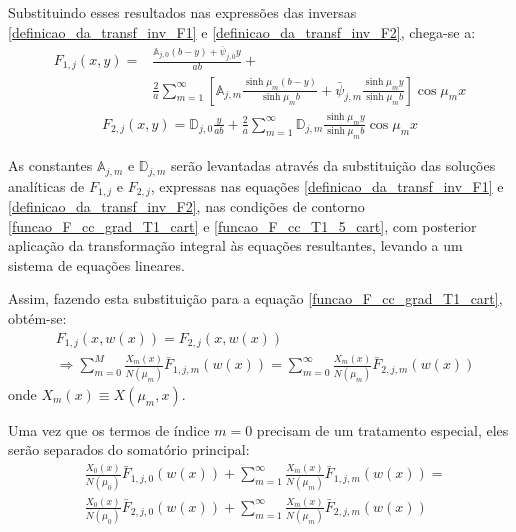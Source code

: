 Substituindo esses resultados
nas expressões das inversas \eqref{definicao_da_transf_inv_F1} e \eqref{definicao_da_transf_inv_F2}, chega-se a:
\begin{align}
F_{1, j}(x, y) = & \frac{\mathbb{A}_{j,0}(b - y) + \bar{\psi}_{j,0}y}{ab} + \nonumber \\
&\frac{2}{a}\sum_{m=1}^\infty\left[\mathbb{A}_{j,m}\frac{\sinh\mu_m (b - y)}{\sinh\mu_m b} + \bar{\psi}_{j, m}\frac{\sinh\mu_m y}{\sinh\mu_m b}\right]\cos\mu_m x
\label{solucao_transf_inversa_F1_com_dependencia}
\end{align}
\begin{align}
F_{2, j}(x, y) = \mathbb{D}_{j,0}\frac{y}{ab}  + \frac{2}{a}\sum_{m=1}^\infty\mathbb{D}_{j,m}\frac{\sinh\mu_m y}{\sinh\mu_m b} \cos\mu_m x
\label{solucao_transf_inversa_F2_com_dependencia}
\end{align}

As constantes $\mathbb{A}_{j,m}$ e $\mathbb{D}_{j,m}$ serão levantadas através da substituição das soluções analíticas de $F_{1,j}$ e $F_{2,j}$, expressas nas equações \eqref{definicao_da_transf_inv_F1} e
\eqref{definicao_da_transf_inv_F2}, nas condições de contorno \eqref{funcao_F_cc_grad_T1_cart} e \eqref{funcao_F_cc_T1_5_cart}, com posterior aplicação da transformação integral às equações resultantes, levando a um sistema de equações lineares.

Assim, fazendo esta
substituição para a equação \eqref{funcao_F_cc_grad_T1_cart}, obtém-se:
\begin{align}
& F_{1,j}(x, w(x)) = F_{2, j}(x, w(x)) \nonumber \\
& \Rightarrow \sum_{m=0}^M \frac{X_m(x)}{N(\mu_m)}\bar{F}_{1,j,m}(w(x)) = \sum_{m=0}^\infty \frac{X_m(x)}{N(\mu_m)}\bar{F}_{2,j,m}(w(x))
\end{align}
onde $X_m(x) \equiv X(\mu_m, x)$.

Uma vez que os termos de índice $m = 0$ precisam de um tratamento especial, eles serão separados do somatório principal:
\begin{align}
& \frac{X_0(x)}{N(\mu_0)}\bar{F}_{1,j,0}(w(x)) +
\sum_{m=1}^\infty \frac{X_m(x)}{N(\mu_m)}\bar{F}_{1,j,m}(w(x))
= \nonumber \\
& \frac{X_0(x)}{N(\mu_0)}\bar{F}_{2,j,0}(w(x)) +
\sum_{m=1}^\infty \frac{X_m(x)}{N(\mu_m)}\bar{F}_{2,j,m}(w(x))
\end{align}

